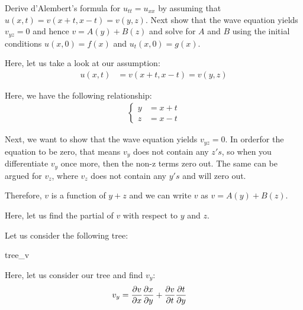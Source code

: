 \item Derive d'Alembert's formula for $u_{tt} = u_{xx}$ by assuming that $u(x, t) = v(x + t, x - t) = v(y, z)$. Next show that the wave equation yields $v_{yz} = 0$ and hence $v = A(y) + B(z)$ and solve for $A$ and $B$ using the initial conditions $u(x, 0) = f(x)$ and $u_t(x, 0) = g(x)$.
\bigbreak

Here, let us take a look at our assumption:
%
\begin{align}
  u(x, t) & = v(x + t, x - t) = v(y, z)
\end{align}

Here, we have the following relationship:
%
\begin{align}
  \begin{cases}
    y & = x + t\\
    z & = x - t
  \end{cases}
\end{align}

Next, we want to show that the wave equation yields $v_{yz} = 0$. In orderfor
the equation to be zero, that means $v_y$ does not contain any $z's$, so when
you differentiate $v_y$ once more, then the non-z terms zero out. The same can
be argued for $v_z$, where $v_z$ does not contain any $y's$ and will zero out.

Therefore, $v$ is a function of $y + z$ and we can write $v$ as
$v = A(y) + B(z)$.


Here, let us find the partial of $v$ with respect to $y$ and $z$.

Let us consider the following tree:

\begin{center}
  {tree_v}
\end{center}

Here, let us consider our tree and find $v_y$:
%
\begin{align}
  v_y & = \frac{\partial v}{\partial x} \frac{\partial x}{\partial y} + \frac{\partial v}{\partial t} \frac{\partial t}{\partial y}
\end{align}

